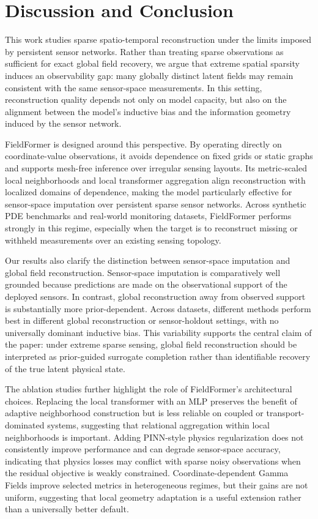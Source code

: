 \section{Discussion and Conclusion}
\label{sec:discussion_conclusion}

This work studies sparse spatio-temporal reconstruction under the limits imposed by persistent sensor networks. Rather than treating sparse observations as sufficient for exact global field recovery, we argue that extreme spatial sparsity induces an observability gap: many globally distinct latent fields may remain consistent with the same sensor-space measurements. In this setting, reconstruction quality depends not only on model capacity, but also on the alignment between the model's inductive bias and the information geometry induced by the sensor network.

FieldFormer is designed around this perspective. By operating directly on coordinate-value observations, it avoids dependence on fixed grids or static graphs and supports mesh-free inference over irregular sensing layouts. Its metric-scaled local neighborhoods and local transformer aggregation align reconstruction with localized domains of dependence, making the model particularly effective for sensor-space imputation over persistent sparse sensor networks. Across synthetic PDE benchmarks and real-world monitoring datasets, FieldFormer performs strongly in this regime, especially when the target is to reconstruct missing or withheld measurements over an existing sensing topology.

Our results also clarify the distinction between sensor-space imputation and global field reconstruction. Sensor-space imputation is comparatively well grounded because predictions are made on the observational support of the deployed sensors. In contrast, global reconstruction away from observed support is substantially more prior-dependent. Across datasets, different methods perform best in different global reconstruction or sensor-holdout settings, with no universally dominant inductive bias. This variability supports the central claim of the paper: under extreme sparse sensing, global field reconstruction should be interpreted as prior-guided surrogate completion rather than identifiable recovery of the true latent physical state.

The ablation studies further highlight the role of FieldFormer's architectural choices. Replacing the local transformer with an MLP preserves the benefit of adaptive neighborhood construction but is less reliable on coupled or transport-dominated systems, suggesting that relational aggregation within local neighborhoods is important. Adding PINN-style physics regularization does not consistently improve performance and can degrade sensor-space accuracy, indicating that physics losses may conflict with sparse noisy observations when the residual objective is weakly constrained. Coordinate-dependent Gamma Fields improve selected metrics in heterogeneous regimes, but their gains are not uniform, suggesting that local geometry adaptation is a useful extension rather than a universally better default.

